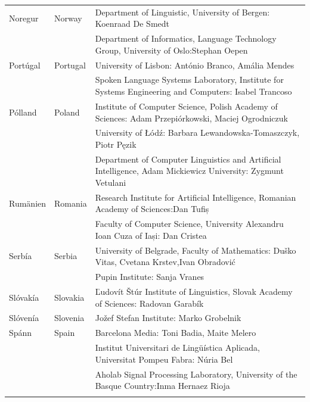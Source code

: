 \documentclass{../../metanetpaper}
\begin{document}
\begin{longtable}{llp{105mm}}
  Noregur & \textcolor{grey1}{Norway} & Department of Linguistic, University of Bergen: Koenraad De Smedt\\ \addlinespace 
  & & Department of Informatics, Language Technology Group, University of Oslo:\newline Stephan Oepen \\ \addlinespace
  Portúgal & \textcolor{grey1}{Portugal} & University of Lisbon: António Branco, Amália Mendes \\ \addlinespace
  & & Spoken Language Systems Laboratory, Institute for Systems Engineering and Computers: Isabel Trancoso \\ \addlinespace
  Pólland & \textcolor{grey1}{Poland} & Institute of Computer Science, Polish Academy of Sciences: Adam Przepiórkowski, Maciej Ogrodniczuk \\ \addlinespace
  & & University of Łódź: Barbara Lewandowska-Tomaszczyk, Piotr Pęzik\\ \addlinespace
  & & Department of Computer Linguistics and Artificial Intelligence, Adam Mickiewicz University: Zygmunt Vetulani \\ \addlinespace
   Rumänien & \textcolor{grey1}{Romania} & Research Institute for Artificial Intelligence, Romanian Academy of Sciences:\newline Dan Tufiș \\ \addlinespace
  & & Faculty of Computer Science, University Alexandru Ioan Cuza of Iași: Dan Cristea \\ \addlinespace
  Serbía & \textcolor{grey1}{Serbia} & University of Belgrade, Faculty of Mathematics: Duško Vitas, Cvetana Krstev,\newline Ivan Obradović \\ \addlinespace
  & & Pupin Institute: Sanja Vranes \\ \addlinespace  
  Slóvakía & \textcolor{grey1}{Slovakia} & Ľudovít Štúr Institute of Linguistics, Slovak Academy of Sciences: Radovan Garabík \\ \addlinespace 
  Slóvenía & \textcolor{grey1}{Slovenia} & Jožef Stefan Institute: Marko Grobelnik \\ \addlinespace 
  Spánn & \textcolor{grey1}{Spain} & Barcelona Media: Toni Badia, Maite Melero \\ \addlinespace 
  & & Institut Universitari de Lingüística Aplicada, Universitat Pompeu Fabra: Núria Bel \\ \addlinespace 
  & & Aholab Signal Processing Laboratory, University of the Basque Country:\newline Inma Hernaez Rioja \\ \addlinespace 

\end{longtable}
\end{document}

